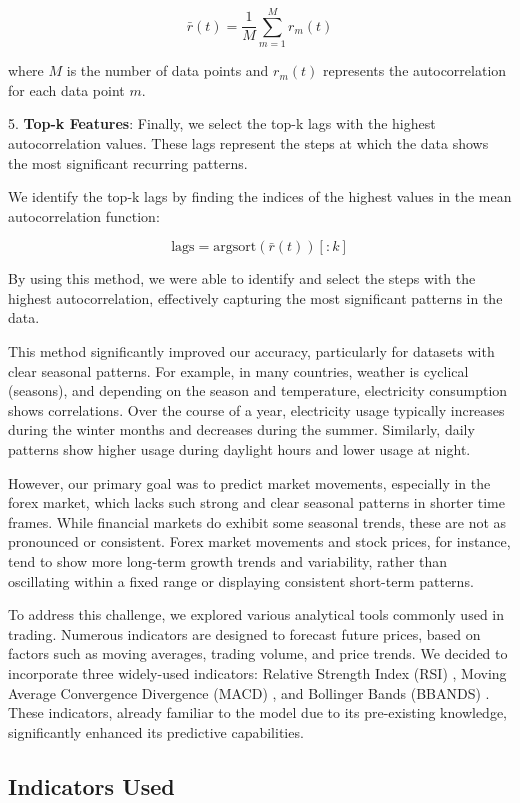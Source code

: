 \[
	\bar{r}(t) = \frac{1}{M} \sum_{m=1}^{M} r_m(t)
\]

where \( M \) is the number of data points and \( r_m(t) \) represents the autocorrelation for each data point \( m \).

5. \textbf{Top-k Features}: Finally, we select the top-k lags with the highest autocorrelation values. These lags represent the steps at which the data shows the most significant recurring patterns.

We identify the top-k lags by finding the indices of the highest values in the mean autocorrelation function:

\[
	\text{lags} = \text{argsort}(\bar{r}(t))[:k]
\]

By using this method, we were able to identify and select the steps with the highest autocorrelation, effectively capturing the most significant patterns in the data.

This method significantly improved our accuracy, particularly for datasets with clear seasonal patterns. For example, in many countries, weather is cyclical (seasons), and depending on the season and temperature, electricity consumption shows correlations. Over the course of a year, electricity usage typically increases during the winter months and decreases during the summer. Similarly, daily patterns show higher usage during daylight hours and lower usage at night.

However, our primary goal was to predict market movements, especially in the forex market, which lacks such strong and clear seasonal patterns in shorter time frames. While financial markets do exhibit some seasonal trends, these are not as pronounced or consistent. Forex market movements and stock prices, for instance, tend to show more long-term growth trends and variability, rather than oscillating within a fixed range or displaying consistent short-term patterns.

To address this challenge, we explored various analytical tools commonly used in trading. Numerous indicators are designed to forecast future prices, based on factors such as moving averages, trading volume, and price trends. We decided to incorporate three widely-used indicators: Relative Strength Index (RSI) \cite{rsi}, Moving Average Convergence Divergence (MACD) \cite{macd}, and Bollinger Bands (BBANDS) \cite{bbands}. These indicators, already familiar to the model due to its pre-existing knowledge, significantly enhanced its predictive capabilities.


\subsection{Indicators Used}

